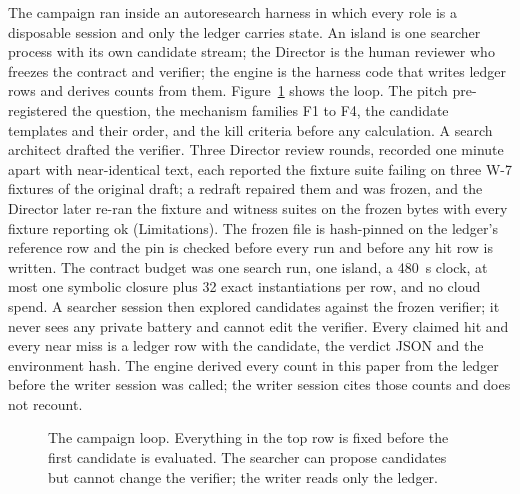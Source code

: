 \documentclass[11pt]{article}
\begin{document}
The campaign ran inside an autoresearch harness in which every role is a disposable session and only the ledger carries state. An island is one searcher process with its own candidate stream; the Director is the human reviewer who freezes the contract and verifier; the engine is the harness code that writes ledger rows and derives counts from them. Figure~\ref{fig:pipeline} shows the loop. The pitch pre-registered the question, the mechanism families F1 to F4, the candidate templates and their order, and the kill criteria before any calculation. A search architect drafted the verifier. Three Director review rounds, recorded one minute apart with near-identical text, each reported the fixture suite failing on three W-7 fixtures of the original draft; a redraft repaired them and was frozen, and the Director later re-ran the fixture and witness suites on the frozen bytes with every fixture reporting ok (Limitations). The frozen file is hash-pinned on the ledger's reference row and the pin is checked before every run and before any hit row is written. The contract budget was one search run, one island, a 480~s clock, at most one symbolic closure plus 32 exact instantiations per row, and no cloud spend. A searcher session then explored candidates against the frozen verifier; it never sees any private battery and cannot edit the verifier. Every claimed hit and every near miss is a ledger row with the candidate, the verdict JSON and the environment hash. The engine derived every count in this paper from the ledger before the writer session was called; the writer session cites those counts and does not recount.

\begin{figure}[t]
\centering
{}
\caption{The campaign loop. Everything in the top row is fixed before the first candidate is evaluated. The searcher can propose candidates but cannot change the verifier; the writer reads only the ledger.}
\label{fig:pipeline}
\end{figure}
\end{document}
